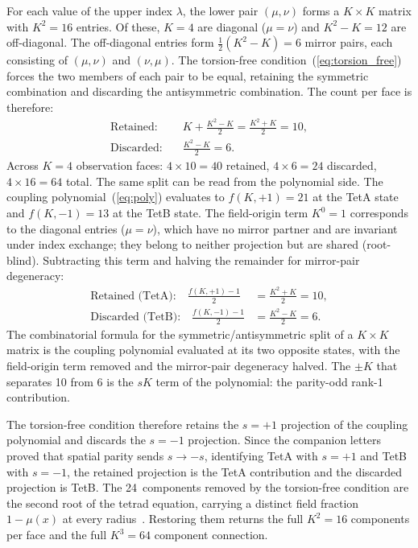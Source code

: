\documentclass[twocolumn]{iopjournal}
\begin{document}
For each value of the upper index $\lambda$, the lower pair
$(\mu, \nu)$ forms a $K \times K$ matrix with $K^2 = 16$
entries.  Of these, $K = 4$ are diagonal ($\mu = \nu$) and
$K^2 - K = 12$ are off-diagonal.  The off-diagonal entries
form $\tfrac{1}{2}(K^2 - K) = 6$ mirror pairs, each
consisting of $(\mu, \nu)$ and $(\nu, \mu)$.  The
torsion-free condition~(\ref{eq:torsion_free}) forces the two
members of each pair to be equal, retaining the symmetric
combination and discarding the antisymmetric combination.  The
count per face is therefore:
\begin{align}
  \text{Retained:} \quad
    & K + \frac{K^2 - K}{2} = \frac{K^2 + K}{2} = 10,
    \label{eq:kept} \\[4pt]
  \text{Discarded:} \quad
    & \frac{K^2 - K}{2} = 6.
    \label{eq:disc}
\end{align}
Across $K = 4$ observation faces: $4 \times 10 = 40$ retained,
$4 \times 6 = 24$ discarded, $4 \times 16 = 64$ total.
The same split can be read from the polynomial side.
The coupling polynomial~(\ref{eq:poly})
evaluates to $f(K,{+}1) = 21$ at the TetA state and
$f(K,{-}1) = 13$ at the TetB state.  The field-origin term
$K^0 = 1$ corresponds to the diagonal entries ($\mu = \nu$),
which have no mirror partner and are invariant under index
exchange; they belong to neither projection but are shared
(root-blind).  Subtracting this term and halving the remainder
for mirror-pair degeneracy:
\begin{align}
  \text{Retained (TetA):} \quad
    \frac{f(K,{+}1) - 1}{2}
    &= \frac{K^2 + K}{2} = 10,
    \label{eq:poly_kept} \\[6pt]
  \text{Discarded (TetB):} \quad
    \frac{f(K,{-}1) - 1}{2}
    &= \frac{K^2 - K}{2} = 6.
    \label{eq:poly_disc}
\end{align}
The combinatorial formula for the symmetric/antisymmetric
split of a $K \times K$ matrix is the coupling polynomial
evaluated at its two opposite states, with the field-origin
term removed and the mirror-pair degeneracy halved.  The
$\pm K$ that separates 10 from 6 is the $sK$ term of the
polynomial: the parity-odd rank-1 contribution.

The torsion-free condition therefore retains the $s = +1$
projection of the coupling polynomial and discards the
$s = -1$ projection.  Since the companion
letters~\cite{Nelson2026a,Nelson2026b} proved
that spatial parity sends $s \to -s$, identifying TetA with
$s = +1$ and TetB with $s = -1$, the retained projection is
the TetA contribution and the discarded projection is TetB.
The 24~components removed by the torsion-free condition are
the second root of the tetrad equation, carrying a distinct
field fraction $1 - \mu(x)$ at every
radius~\cite{Nelson2026b}.  Restoring them
returns the full $K^2 = 16$ components per face and the full
$K^3 = 64$ component connection.
\end{document}
